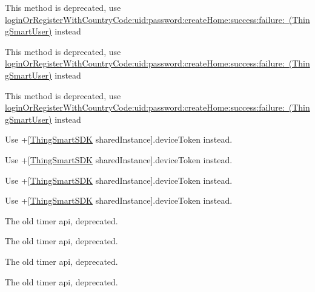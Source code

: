 \begin{DoxyRefList}
\label{deprecated__deprecated000235}%
%
This method is deprecated, use \mbox{\hyperlink{interface_thing_smart_user_a2e848d4067bc3e9aed5a7db187ceecd6}{login\+Or\+Register\+With\+Country\+Code\+:uid\+:password\+:create\+Home\+:success\+:failure\+: (\+Thing\+Smart\+User)}} instead 

\label{deprecated__deprecated000225}%
%
This method is deprecated, use \mbox{\hyperlink{interface_thing_smart_user_a2e848d4067bc3e9aed5a7db187ceecd6}{login\+Or\+Register\+With\+Country\+Code\+:uid\+:password\+:create\+Home\+:success\+:failure\+: (\+Thing\+Smart\+User)}} instead 

\label{deprecated__deprecated000205}%
%
This method is deprecated, use \mbox{\hyperlink{interface_thing_smart_user_a2e848d4067bc3e9aed5a7db187ceecd6}{login\+Or\+Register\+With\+Country\+Code\+:uid\+:password\+:create\+Home\+:success\+:failure\+: (\+Thing\+Smart\+User)}} instead  
\item[(Push\+Notification) Member \mbox{\hyperlink{category_thing_smart_s_d_k_07_push_notification_08_aa8483c80a90101a7dc44192069bc07da}{Thing\+Smart\+SDK(Push\+Notification)\+::push\+Token}} ]\label{deprecated__deprecated000208}%
%
Use +\mbox{[}\mbox{\hyperlink{interface_thing_smart_s_d_k}{Thing\+Smart\+SDK}} shared\+Instance\mbox{]}.device\+Token instead. 

\label{deprecated__deprecated000228}%
%
Use +\mbox{[}\mbox{\hyperlink{interface_thing_smart_s_d_k}{Thing\+Smart\+SDK}} shared\+Instance\mbox{]}.device\+Token instead. 

\label{deprecated__deprecated000218}%
%
Use +\mbox{[}\mbox{\hyperlink{interface_thing_smart_s_d_k}{Thing\+Smart\+SDK}} shared\+Instance\mbox{]}.device\+Token instead. 

\label{deprecated__deprecated000238}%
%
Use +\mbox{[}\mbox{\hyperlink{interface_thing_smart_s_d_k}{Thing\+Smart\+SDK}} shared\+Instance\mbox{]}.device\+Token instead.  
\item[(Thing\+Deprecated\+Api) Class \mbox{\hyperlink{category_thing_smart_timer_07_thing_deprecated_api_08}{Thing\+Smart\+Timer(Thing\+Deprecated\+Api)}} ]\label{deprecated__deprecated000113}%
%
The old timer api, deprecated.

\label{deprecated__deprecated000122}%
%
The old timer api, deprecated.

\label{deprecated__deprecated000095}%
%
The old timer api, deprecated.

\label{deprecated__deprecated000104}%
%
The old timer api, deprecated.
\end{DoxyRefList}